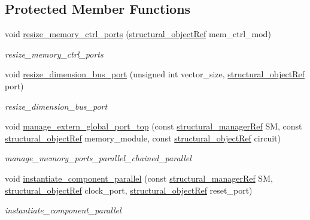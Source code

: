 \subsection*{Protected Member Functions}
\begin{DoxyCompactItemize}
\item 
void \hyperlink{classcs__interface_a616abde63bd8faaf2dd2d3ebed402ee8}{resize\+\_\+memory\+\_\+ctrl\+\_\+ports} (\hyperlink{structural__objects_8hpp_a8ea5f8cc50ab8f4c31e2751074ff60b2}{structural\+\_\+object\+Ref} mem\+\_\+ctrl\+\_\+mod)
\begin{DoxyCompactList}\small\item\em resize\+\_\+memory\+\_\+ctrl\+\_\+ports \end{DoxyCompactList}\item 
void \hyperlink{classcs__interface_a6c229dab4a01f3cde49f836faefde734}{resize\+\_\+dimension\+\_\+bus\+\_\+port} (unsigned int vector\+\_\+size, \hyperlink{structural__objects_8hpp_a8ea5f8cc50ab8f4c31e2751074ff60b2}{structural\+\_\+object\+Ref} port)
\begin{DoxyCompactList}\small\item\em resize\+\_\+dimension\+\_\+bus\+\_\+port \end{DoxyCompactList}\item 
void \hyperlink{classcs__interface_a1079f7e26ff08aef06667ecd87181c7d}{manage\+\_\+extern\+\_\+global\+\_\+port\+\_\+top} (const \hyperlink{structural__manager_8hpp_ab3136f0e785d8535f8d252a7b53db5b5}{structural\+\_\+manager\+Ref} SM, const \hyperlink{structural__objects_8hpp_a8ea5f8cc50ab8f4c31e2751074ff60b2}{structural\+\_\+object\+Ref} memory\+\_\+module, const \hyperlink{structural__objects_8hpp_a8ea5f8cc50ab8f4c31e2751074ff60b2}{structural\+\_\+object\+Ref} circuit)
\begin{DoxyCompactList}\small\item\em manage\+\_\+memory\+\_\+ports\+\_\+parallel\+\_\+chained\+\_\+parallel \end{DoxyCompactList}\item 
void \hyperlink{classcs__interface_a2c5cacb106ce0e000f1a7fe2f5caf5a8}{instantiate\+\_\+component\+\_\+parallel} (const \hyperlink{structural__manager_8hpp_ab3136f0e785d8535f8d252a7b53db5b5}{structural\+\_\+manager\+Ref} SM, \hyperlink{structural__objects_8hpp_a8ea5f8cc50ab8f4c31e2751074ff60b2}{structural\+\_\+object\+Ref} clock\+\_\+port, \hyperlink{structural__objects_8hpp_a8ea5f8cc50ab8f4c31e2751074ff60b2}{structural\+\_\+object\+Ref} reset\+\_\+port)
\begin{DoxyCompactList}\small\item\em instantiate\+\_\+component\+\_\+parallel \end{DoxyCompactList}\item 

\end{DoxyCompactItemize}
